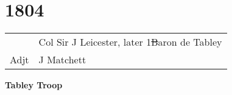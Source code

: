 \chapter*{1804}

\vspace*{10mm}

\begin{center}
  \begin{tabular}{rl}
    & Col Sir J Leicester, later 1\st Baron de Tabley \\
    Adjt & J Matchett \\
  \end{tabular}
\end{center}

\vspace*{10mm}

\begin{center}
  \Large
  \textbf{Tabley Troop}
\end{center}

\vspace*{10mm}


